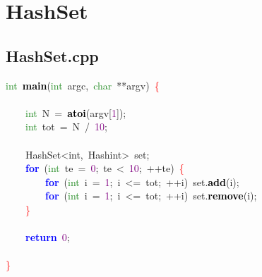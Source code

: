 \section{HashSet}
\subsection{HashSet.cpp}
\noindent
\mbox{}\textcolor{ForestGreen}{int}\ \textbf{\textcolor{Black}{main}}\textcolor{BrickRed}{(}\textcolor{ForestGreen}{int}\ argc\textcolor{BrickRed}{,}\ \textcolor{ForestGreen}{char}\ \textcolor{BrickRed}{**}argv\textcolor{BrickRed}{)}\ \textcolor{Red}{\{} \\
\mbox{} \\
\mbox{}\ \ \ \ \textcolor{ForestGreen}{int}\ N\ \textcolor{BrickRed}{=}\ \textbf{\textcolor{Black}{atoi}}\textcolor{BrickRed}{(}argv\textcolor{BrickRed}{[}\textcolor{Purple}{1}\textcolor{BrickRed}{]);} \\
\mbox{}\ \ \ \ \textcolor{ForestGreen}{int}\ tot\ \textcolor{BrickRed}{=}\ N\ \textcolor{BrickRed}{/}\ \textcolor{Purple}{10}\textcolor{BrickRed}{;} \\
\mbox{} \\
\mbox{}\ \ \ \ \textcolor{TealBlue}{HashSet\textless{}int,\ Hashint\textgreater{}}\ set\textcolor{BrickRed}{;} \\
\mbox{}\ \ \ \ \textbf{\textcolor{Blue}{for}}\ \textcolor{BrickRed}{(}\textcolor{ForestGreen}{int}\ te\ \textcolor{BrickRed}{=}\ \textcolor{Purple}{0}\textcolor{BrickRed}{;}\ te\ \textcolor{BrickRed}{\textless{}}\ \textcolor{Purple}{10}\textcolor{BrickRed}{;}\ \textcolor{BrickRed}{++}te\textcolor{BrickRed}{)}\ \textcolor{Red}{\{} \\
\mbox{}\ \ \ \ \ \ \ \ \textbf{\textcolor{Blue}{for}}\ \textcolor{BrickRed}{(}\textcolor{ForestGreen}{int}\ i\ \textcolor{BrickRed}{=}\ \textcolor{Purple}{1}\textcolor{BrickRed}{;}\ i\ \textcolor{BrickRed}{\textless{}=}\ tot\textcolor{BrickRed}{;}\ \textcolor{BrickRed}{++}i\textcolor{BrickRed}{)}\ set\textcolor{BrickRed}{.}\textbf{\textcolor{Black}{add}}\textcolor{BrickRed}{(}i\textcolor{BrickRed}{);} \\
\mbox{}\ \ \ \ \ \ \ \ \textbf{\textcolor{Blue}{for}}\ \textcolor{BrickRed}{(}\textcolor{ForestGreen}{int}\ i\ \textcolor{BrickRed}{=}\ \textcolor{Purple}{1}\textcolor{BrickRed}{;}\ i\ \textcolor{BrickRed}{\textless{}=}\ tot\textcolor{BrickRed}{;}\ \textcolor{BrickRed}{++}i\textcolor{BrickRed}{)}\ set\textcolor{BrickRed}{.}\textbf{\textcolor{Black}{remove}}\textcolor{BrickRed}{(}i\textcolor{BrickRed}{);} \\
\mbox{}\ \ \ \ \textcolor{Red}{\}} \\
\mbox{} \\
\mbox{}\ \ \ \ \textbf{\textcolor{Blue}{return}}\ \textcolor{Purple}{0}\textcolor{BrickRed}{;} \\
\mbox{} \\
\mbox{}\textcolor{Red}{\}} \\
\mbox{}
